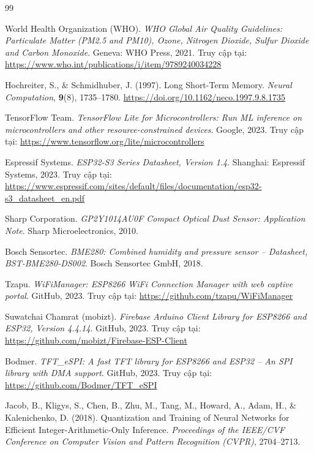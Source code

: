 \documentclass[12pt,a4paper]{article}
\begin{document}
\begin{thebibliography}{99}

World Health Organization (WHO). \textit{WHO Global Air Quality Guidelines: Particulate Matter (PM2.5 and PM10), Ozone, Nitrogen Dioxide, Sulfur Dioxide and Carbon Monoxide}. Geneva: WHO Press, 2021. Truy cập tại: \url{https://www.who.int/publications/i/item/9789240034228}

Hochreiter, S., \& Schmidhuber, J. (1997). Long Short-Term Memory. \textit{Neural Computation}, \textbf{9}(8), 1735--1780. \url{https://doi.org/10.1162/neco.1997.9.8.1735}

TensorFlow Team. \textit{TensorFlow Lite for Microcontrollers: Run ML inference on microcontrollers and other resource-constrained devices}. Google, 2023. Truy cập tại: \url{https://www.tensorflow.org/lite/microcontrollers}

Espressif Systems. \textit{ESP32-S3 Series Datasheet, Version 1.4}. Shanghai: Espressif Systems, 2023. Truy cập tại: \url{https://www.espressif.com/sites/default/files/documentation/esp32-s3_datasheet_en.pdf}

Sharp Corporation. \textit{GP2Y1014AU0F Compact Optical Dust Sensor: Application Note}. Sharp Microelectronics, 2010.

Bosch Sensortec. \textit{BME280: Combined humidity and pressure sensor -- Datasheet, BST-BME280-DS002}. Bosch Sensortec GmbH, 2018.

Tzapu. \textit{WiFiManager: ESP8266 WiFi Connection Manager with web captive portal}. GitHub, 2023. Truy cập tại: \url{https://github.com/tzapu/WiFiManager}

Suwatchai Chamrat (mobizt). \textit{Firebase Arduino Client Library for ESP8266 and ESP32, Version 4.4.14}. GitHub, 2023. Truy cập tại: \url{https://github.com/mobizt/Firebase-ESP-Client}

Bodmer. \textit{TFT\_eSPI: A fast TFT library for ESP8266 and ESP32 -- An SPI library with DMA support}. GitHub, 2023. Truy cập tại: \url{https://github.com/Bodmer/TFT_eSPI}

Jacob, B., Kligys, S., Chen, B., Zhu, M., Tang, M., Howard, A., Adam, H., \& Kalenichenko, D. (2018). Quantization and Training of Neural Networks for Efficient Integer-Arithmetic-Only Inference. \textit{Proceedings of the IEEE/CVF Conference on Computer Vision and Pattern Recognition (CVPR)}, 2704--2713.

\end{thebibliography}
\end{document}
